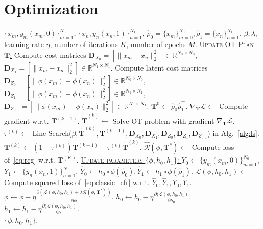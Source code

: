 \documentclass{article}
\begin{document}
\section{Optimization}
\begin{algorithm}[tb]
\caption{Bi-level Optimization of GWIB}
\label{alg:main}
\begin{algorithmic}[1]
	\Require  $\{x_m,y_m(x_m,0)\}_{m=1}^{N_0}$,  $\{x_n,y_n(x_n,1)\}_{n=1}^{N_1}$, $\hat{\rho}_0 = \{x_m\}^{N_0}_{m=0}, \hat{\rho}_1=\{x_n\}_{n=1}^{N_1}$, $\beta, \lambda$, learning rate $\eta$, number of iterations $K$, number of epochs $M$.
	\Statex \textsc{\underline{Update OT Plan $\bm{T}$:}}
    \State Compute cost matrices $\bm{D}_{X_0}=[\|x_m-x_n\|_2^2]\in\mathbb{R}^{N_0\times N_0}$, $\bm{D}_{X_1}=[\|x_m-x_n\|_2^2]\in\mathbb{R}^{N_1\times N_1}$.
	\State Compute latent cost matrices $\bm{D}_{Z_0}=[\|\phi(x_m)-\phi(x_n)\|_2^2] \in\mathbb{R}^{N_0\times N_0} $, $\bm{D}_{Z_1}=[\|\phi(x_m)-\phi(x_n)\|_2^2] \in\mathbb{R}^{N_1\times N_1}$, 
    $\bm{D}_{Z_{0,1}}=[\|\phi(x_m)-\phi(x_n)\|_2^2] \in\mathbb{R}^{N_0\times N_1}$.
	\State $\bm{T}^0 \leftarrow \hat{\rho}_0 \hat{\rho}_1^\top$.
	\State $\nabla_{\bm{T}}\mathcal{L} \leftarrow$ Compute gradient w.r.t. $\bm{T}^{(k-1)}$. 
	\State $\widetilde{\bm{T}}^{(k)} \leftarrow$ Solve OT problem with gradient $\nabla_{\bm{T}}\mathcal{L}$. 
	\State $\tau^{(k)} \leftarrow$ Line-Search($\beta, \widetilde{\bm{T}}^{(k)},\bm{T}^{(k-1)}, \bm{D}_{X_0},\bm{D}_{X_1}, \bm{D}_{Z_0}, \bm{D}_{Z_1}, \bm{D}_{Z_{0,1}}$) in Alg.~\ref{alg:ls}.
	\State $\bm{T}^{(k)} \leftarrow (1 - \tau^{(k)}) \bm{T}^{(k-1)} + \tau^{(k)}\widetilde{\bm{T}}^{(k)}$. 
	\EndFor
	\State $\widehat{\mathcal{R}}(\phi,\bm{T}^*) \leftarrow$ Compute loss of~\eqref{eq:reg} w.r.t. $\bm{T}^{(K)}$. 
	\Statex \textsc{\underline{Update parameters $\{\phi, h_0, h_1\}$: }} 
	\State $Y_0 \leftarrow \{y_m(x_m, 0)\}_{m=1}^{N_0}$, $Y_1 \leftarrow \{y_n(x_n, 1)\}_{n=1}^{N_1}$.
	\State $\hat{Y}_0 \leftarrow h_0 \circ \phi(\hat{\rho}_0), \hat{Y}_1 \leftarrow h_1 \circ \phi(\hat{\rho}_1)$. 
	\State $\mathcal{L}(\phi, h_0, h_1) \leftarrow$ Compute squared loss of~\eqref{eq:classic_cfr} w.r.t. $\hat{Y}_0, \hat{Y}_1, Y_0, Y_1$.
	\State $\phi \leftarrow \phi  - \eta \frac{\partial (\mathcal{L}(\phi, h_0, h_1) + \lambda \mathcal{R}(\phi, \bm{T}^*))}{\partial \phi}$.
	\State $h_0 \leftarrow h_0  - \eta \frac{\partial (\mathcal{L}(\phi, h_0, h_1)}{\partial h_0}$.
	\State $h_1 \leftarrow h_1  - \eta \frac{\partial (\mathcal{L}(\phi, h_0, h_1)}{\partial h_1}$.
	\EndFor \\
	\Return $\{\phi, h_0, h_1\}$.
\end{algorithmic}
\end{algorithm}
\end{document}
